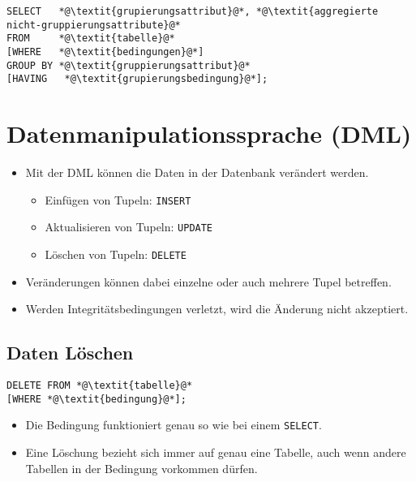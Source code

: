 \documentclass[a4paper, 11pt, accentcolor = tud3b]{tudreport}
\begin{document}
            	\begin{lstlisting}
SELECT   *@\textit{grupierungsattribut}@*, *@\textit{aggregierte nicht-gruppierungsattribute}@*
FROM     *@\textit{tabelle}@*
[WHERE   *@\textit{bedingungen}@*]
GROUP BY *@\textit{gruppierungsattribut}@*
[HAVING   *@\textit{grupierungsbedingung}@*];
            	\end{lstlisting}

        \section{Datenmanipulationssprache (DML)} %
            \begin{itemize}
            	\item Mit der DML können die Daten in der Datenbank verändert werden.
            		\begin{itemize}
            			\item Einfügen von Tupeln: \lstinline|INSERT|
            			\item Aktualisieren von Tupeln: \lstinline|UPDATE|
            			\item Löschen von Tupeln: \lstinline|DELETE|
            		\end{itemize}
            	\item Veränderungen können dabei einzelne oder auch mehrere Tupel betreffen.
            	\item Werden Integritätsbedingungen verletzt, wird die Änderung nicht akzeptiert.
            \end{itemize}

            \subsection{Daten Löschen} %
                \begin{lstlisting}
DELETE FROM *@\textit{tabelle}@*
[WHERE *@\textit{bedingung}@*];
                \end{lstlisting}
                
                \begin{itemize}
                	\item Die Bedingung funktioniert genau so wie bei einem \lstinline|SELECT|.
                	\item Eine Löschung bezieht sich immer auf genau eine Tabelle, auch wenn andere Tabellen in der Bedingung vorkommen dürfen.
                \end{itemize}
\end{document}
